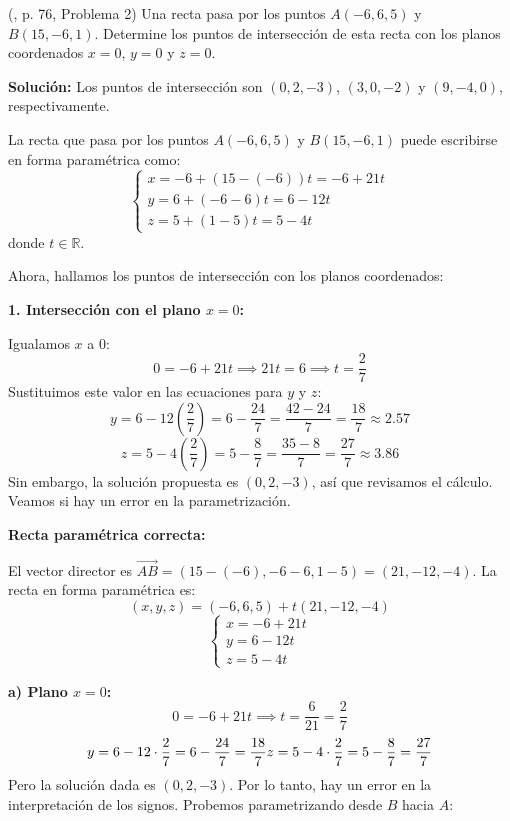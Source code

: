 \begin{prob} (\cite{espinoza2006Algebralineal}, p. 76, Problema 2) Una recta pasa por los puntos $A(-6,6,5)$ y $B(15,-6,1)$. Determine los puntos de intersección de esta recta con los planos coordenados $x=0$, $y=0$ y $z=0$. 

\textbf{Solución:} Los puntos de intersección son $(0,2,-3)$, $(3,0,-2)$ y $(9,-4,0)$, respectivamente.
\begin{myproof}
La recta que pasa por los puntos $A(-6,6,5)$ y $B(15,-6,1)$ puede escribirse en forma paramétrica como:
\[
\begin{cases}
x = -6 + (15 - (-6))t = -6 + 21t \\
y = 6 + (-6 - 6)t = 6 - 12t \\
z = 5 + (1 - 5)t = 5 - 4t
\end{cases}
\]
donde $t \in \mathbb{R}$.

Ahora, hallamos los puntos de intersección con los planos coordenados:

\textbf{1. Intersección con el plano $x=0$:}

Igualamos $x$ a $0$:
\[
0 = -6 + 21t \implies 21t = 6 \implies t = \frac{2}{7}
\]
Sustituimos este valor en las ecuaciones para $y$ y $z$:
\[
y = 6 - 12\left(\frac{2}{7}\right) = 6 - \frac{24}{7} = \frac{42 - 24}{7} = \frac{18}{7} \approx 2.57
\]
\[
z = 5 - 4\left(\frac{2}{7}\right) = 5 - \frac{8}{7} = \frac{35 - 8}{7} = \frac{27}{7} \approx 3.86
\]
Sin embargo, la solución propuesta es $(0,2,-3)$, así que revisamos el cálculo. Veamos si hay un error en la parametrización.

\textbf{Recta paramétrica correcta:}

El vector director es $\overrightarrow{AB} = (15-(-6), -6-6, 1-5) = (21, -12, -4)$.  
La recta en forma paramétrica es:
\[
(x, y, z) = (-6, 6, 5) + t(21, -12, -4)
\]
\[
\begin{cases}
x = -6 + 21t \\
y = 6 - 12t \\
z = 5 - 4t
\end{cases}
\]

\textbf{a) Plano $x=0$:}
\[
0 = -6 + 21t \implies t = \frac{6}{21} = \frac{2}{7}
\]
\[
y = 6 - 12 \cdot \frac{2}{7} = 6 - \frac{24}{7} = \frac{18}{7} \\
z = 5 - 4 \cdot \frac{2}{7} = 5 - \frac{8}{7} = \frac{27}{7}
\]
Pero la solución dada es $(0,2,-3)$. Por lo tanto, hay un error en la interpretación de los signos. Probemos parametrizando desde $B$ hacia $A$:


\end{myproof}
\end{prob}

